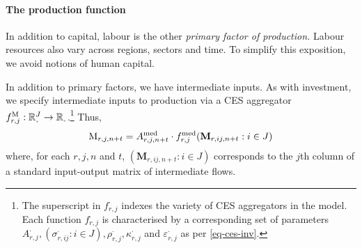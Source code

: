 \documentclass[12pt,a4paper,twoside, draft]{article}
\begin{document}
\paragraph{The production function}
In addition to capital, labour is the other \emph{primary factor of
production.}
Labour resources also vary across regions, sectors and time.
To simplify this exposition, we avoid notions of human capital.

In addition to primary factors, we have intermediate inputs.
As with investment, we specify intermediate inputs to production via a CES
aggregator $f_{r, j}^{\textup{M}}: \nnreal^{J} \rightarrow
\nnreal$.\footnote{
  The superscript in $f_{r, j}^{\cdot}$ indexes the variety of CES
  aggregators in the model.
  Each function $f_{r, j}^{\cdot}$ is characterised by a corresponding
  set of parameters
  $A_{r, j}^{\cdot}, (\sigma_{r, ij}^{\cdot}: i \in J),
  \rho_{r, j}^{\cdot}, \kappa_{r, j}^{\cdot} $ and
  $\varepsilon_{r, j}^{\cdot}$ as per \cref{eq-ces-inv}.
}
Thus,
\begin{equation}\label{eq-ces-int}
  \textup{M}_{r, j, n + t} = A_{r, j, n + t}^{\textup{med}}
    \cdot f_{r, j}^{\textup{med}}(
      \mathbf{M}_{r, ij, n + t}: i \in J
      )
\end{equation}
where, for each $r, j, n$ and $t$, $(\textbf{M}_{r,ij,n + t} : i \in J)$
corresponds to the $j$th column of a standard input-output matrix of
intermediate flows.
\end{document}
